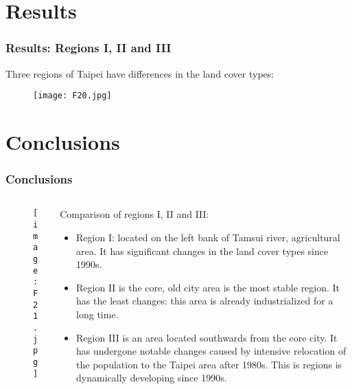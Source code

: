 \documentclass[pdflatex,compress,8pt,
	xcolor={dvipsnames,dvipsnames,svgnames,x11names,table},
	hyperref={colorlinks = true,breaklinks = true, urlcolor = NavyBlue, breaklinks = true}]{beamer}
\begin{document}
\section{Results}
\begin{frame}\frametitle{Results: Regions I, II and III}
Three regions of Taipei have differences in the land cover types:
\begin{figure}[H]
	\centering
		\texttt{[image: F20.jpg]}
\end{figure}
\end{frame}

\section{Conclusions}
\begin{frame}\frametitle{Conclusions}
\begin{minipage}[0.4\textheight]{\textwidth}
\begin{columns}[T]
\begin{column}{0.5\textwidth}
\vspace{2em}
\begin{figure}[H]
	\centering
		\texttt{[image: F21.jpg]}
\end{figure}
\end{column}
\begin{column}{0.5\textwidth}
\vspace{2em}
Comparison of regions I, II and III:
\begin{itemize}
	\item Region I: located on the left bank of Tamsui river, agricultural area. It has significant changes in the land cover types since 1990s. 
	\item Region II is the core, old city area is the most stable region. It has the least changes: this area is already industrialized for a long time. 
	\item Region III is an area located southwards from the core city. It has undergone notable changes caused by intensive relocation of the population to the Taipei area after 1980s. This is regions is dynamically developing since 1990s.
\end{itemize}
\end{column}
\end{columns}
\end{minipage}
\end{frame}
\end{document}
